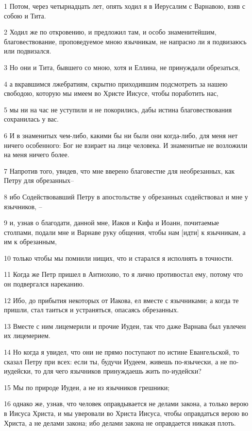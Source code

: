 \par 1 Потом, через четырнадцать лет, опять ходил я в Иерусалим с Варнавою, взяв с собою и Тита.
\par 2 Ходил же по откровению, и предложил там, и особо знаменитейшим, благовествование, проповедуемое мною язычникам, не напрасно ли я подвизаюсь или подвизался.
\par 3 Но они и Тита, бывшего со мною, хотя и Еллина, не принуждали обрезаться,
\par 4 а вкравшимся лжебратиям, скрытно приходившим подсмотреть за нашею свободою, которую мы имеем во Христе Иисусе, чтобы поработить нас,
\par 5 мы ни на час не уступили и не покорились, дабы истина благовествования сохранилась у вас.
\par 6 И в знаменитых чем-либо, какими бы ни были они когда-либо, для меня нет ничего особенного: Бог не взирает на лице человека. И знаменитые не возложили на меня ничего более.
\par 7 Напротив того, увидев, что мне вверено благовестие для необрезанных, как Петру для обрезанных--
\par 8 ибо Содействовавший Петру в апостольстве у обрезанных содействовал и мне у язычников, --
\par 9 и, узнав о благодати, данной мне, Иаков и Кифа и Иоанн, почитаемые столпами, подали мне и Варнаве руку общения, чтобы нам [идти] к язычникам, а им к обрезанным,
\par 10 только чтобы мы помнили нищих, что и старался я исполнять в точности.
\par 11 Когда же Петр пришел в Антиохию, то я лично противостал ему, потому что он подвергался нареканию.
\par 12 Ибо, до прибытия некоторых от Иакова, ел вместе с язычниками; а когда те пришли, стал таиться и устраняться, опасаясь обрезанных.
\par 13 Вместе с ним лицемерили и прочие Иудеи, так что даже Варнава был увлечен их лицемерием.
\par 14 Но когда я увидел, что они не прямо поступают по истине Евангельской, то сказал Петру при всех: если ты, будучи Иудеем, живешь по-язычески, а не по-иудейски, то для чего язычников принуждаешь жить по-иудейски?
\par 15 Мы по природе Иудеи, а не из язычников грешники;
\par 16 однако же, узнав, что человек оправдывается не делами закона, а только верою в Иисуса Христа, и мы уверовали во Христа Иисуса, чтобы оправдаться верою во Христа, а не делами закона; ибо делами закона не оправдается никакая плоть.
